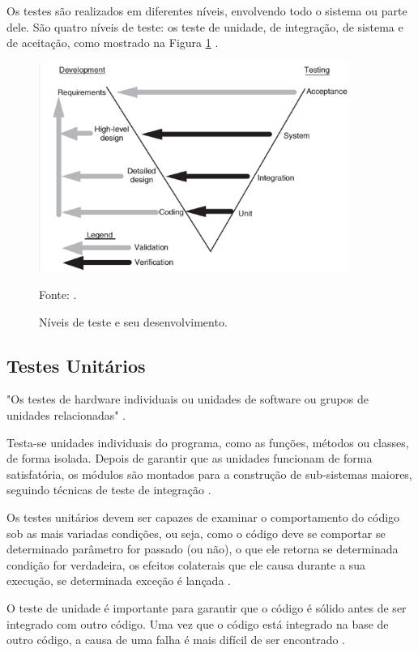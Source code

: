 Os testes são realizados em diferentes níveis, envolvendo todo o sistema ou parte dele. São quatro níveis de teste: os teste de unidade, de integração, de sistema e de aceitação, como mostrado na Figura \ref{nivelTeste} \cite[pág.~18]{naik2008}.

\begin{figure}[H]
\centering
\includegraphics[width=0.9\textwidth]{figuras/nivelTeste}
\caption{Níveis de teste e seu desenvolvimento.}{Fonte: .} 
\label{nivelTeste}
\end{figure}

\subsection{Testes Unitários}

"Os testes de hardware individuais ou unidades de software ou grupos de unidades relacionadas" \cite{ieee}.

Testa-se unidades individuais do programa, como as funções, métodos ou classes, de forma isolada. Depois de garantir que as unidades funcionam de forma satisfatória, os módulos são montados para a construção de sub-sistemas maiores, seguindo técnicas de teste de integração \cite[pág.~18]{naik2008}.

Os testes unitários devem ser capazes de examinar o comportamento do código sob as mais variadas condições, ou seja, como o código deve se comportar se determinado parâmetro for passado (ou não), o que ele retorna se determinada condição for verdadeira, os efeitos colaterais que ele causa durante a sua execução, se determinada exceção é lançada \cite{thiago2001}.

O teste de unidade é importante para garantir que o código é sólido antes de ser integrado com outro código. Uma vez que o código está integrado na base de outro código, a causa de uma falha é mais difícil de ser encontrado \cite{williams2006}.

